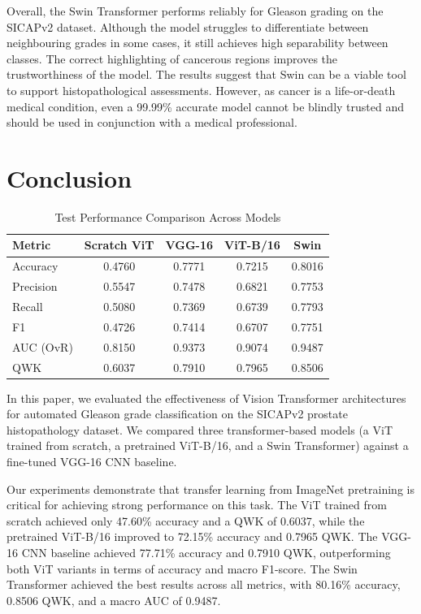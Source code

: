 \documentclass[conference]{IEEEtran}
\begin{document}
Overall, the Swin Transformer performs reliably for Gleason grading on the SICAPv2 dataset. Although the model struggles to differentiate between neighbouring grades in some cases, it still achieves high separability between classes. The correct highlighting of cancerous regions improves the trustworthiness of the model. The results suggest that Swin can be a viable tool to support histopathological assessments. However, as cancer is a life-or-death medical condition, even a 99.99\% accurate model cannot be blindly trusted and should be used in conjunction with a medical professional.


\section{\textbf{Conclusion}}

\begin{table}[!htb]
\caption{Test Performance Comparison Across Models}
\label{tab:all_model_comparison}
\centering
\begin{tabular}{lcccc}
\hline
\textbf{Metric} & \textbf{Scratch ViT} & \textbf{VGG-16} & \textbf{ViT-B/16} & \textbf{Swin} \\
\hline
Accuracy      & 0.4760 & 0.7771 & 0.7215 & 0.8016 \\
Precision     & 0.5547 & 0.7478 & 0.6821 & 0.7753 \\
Recall        & 0.5080 & 0.7369 & 0.6739 & 0.7793 \\
F1            & 0.4726 & 0.7414 & 0.6707 & 0.7751 \\
AUC (OvR)     & 0.8150 & 0.9373 & 0.9074 & 0.9487 \\
QWK           & 0.6037 & 0.7910 & 0.7965 & 0.8506 \\
\hline
\end{tabular}
\end{table}


In this paper, we evaluated the effectiveness of Vision Transformer architectures for automated Gleason grade classification on the SICAPv2 prostate histopathology dataset. We compared three transformer-based models (a ViT trained from scratch, a pretrained ViT-B/16, and a Swin Transformer) against a fine-tuned VGG-16 CNN baseline.

Our experiments demonstrate that transfer learning from ImageNet pretraining is critical for achieving strong performance on this task. The ViT trained from scratch achieved only 47.60\% accuracy and a QWK of 0.6037, while the pretrained ViT-B/16 improved to 72.15\% accuracy and 0.7965 QWK. The VGG-16 CNN baseline achieved 77.71\% accuracy and 0.7910 QWK, outperforming both ViT variants in terms of accuracy and macro F1-score. The Swin Transformer achieved the best results across all metrics, with 80.16\% accuracy, 0.8506 QWK, and a macro AUC of 0.9487.
\end{document}

